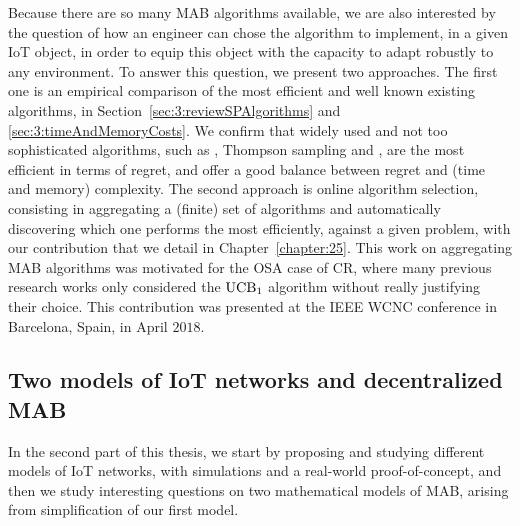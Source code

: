 %
Because there are so many MAB algorithms available, we are also interested by the question of how an engineer can chose the algorithm to implement, in a given IoT object, in order to equip this object with the capacity to adapt robustly to any environment.
To answer this question, we present two approaches.
The first one is an empirical comparison of the most efficient and well known existing algorithms, in Section~\ref{sec:3:reviewSPAlgorithms} and \ref{sec:3:timeAndMemoryCosts}.
We confirm that widely used and not too sophisticated algorithms, such as \UCB{} \cite{Auer02}, Thompson sampling \cite{Thompson33} and \klUCB{} \cite{KLUCBJournal}, are the most efficient in terms of regret, and offer a good balance between regret and (time and memory) complexity.
The second approach is online algorithm selection, consisting in aggregating a (finite) set of algorithms and automatically discovering which one performs the most efficiently, against a given problem, with our contribution \Aggr{} that we detail in Chapter~\ref{chapter:25}.
This work on aggregating MAB algorithms was motivated for the OSA case of CR, where many previous research works only considered the $\mathrm{UCB}_1$ algorithm without really justifying their choice.
This contribution was presented at the IEEE WCNC conference in Barcelona, Spain, in April $2018$.


\subsection{Two models of IoT networks and decentralized MAB}

In the second part of this thesis, we start by proposing and studying different models of IoT networks, with simulations and a real-world proof-of-concept, and then we study interesting questions on two mathematical models of MAB, arising from simplification of our first model.


